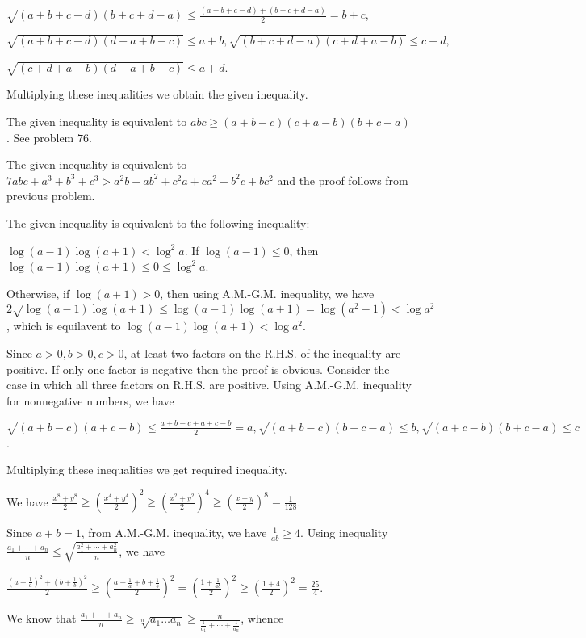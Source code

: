   $\sqrt{(a + b + c - d)(b + c + d - a)}\leq\frac{(a + b + c - d) + (b + c + d - a)}{2} = b + c$,

  $\sqrt{(a + b + c - d)(d + a + b - c)}\leq a + b, \sqrt{(b + c + d - a)(c + d + a - b)}\leq c + d,$

  $\sqrt{(c + d + a - b)(d + a + b - c)}\leq a + d$.

  Multiplying these inequalities we obtain the given inequality.
\item The given inequality is equivalent to $abc \geq (a + b - c)(c + a - b)(b + c - a)$. See problem $76$.
\item The given inequality is equivalent to $7abc + a^3 + b^3 + c^3 > a^2b + ab^2 + c^2a + ca^2 + b^2c +
  bc^2$ and the proof follows from previous problem.
\item The given inequality is equivalent to the following inequality:

  $\log(a - 1)\log(a + 1) < \log^2a$. If $\log(a - 1)\leq 0$, then $\log(a - 1)\log(a + 1)\leq 0\leq
  \log^2a$.

  Otherwise, if $\log(a + 1) > 0$, then using A.M.-G.M. inequality, we have $2\sqrt{\log(a - 1)\log(a +
    1)}\leq \log(a - 1)\log(a + 1) = \log(a^2 - 1) < \log a^2$, which is equilavent to $\log(a - 1)\log(a +
  1) < \log a^2$.
\item Since $a > 0, b > 0, c > 0$, at least two factors on the R.H.S. of the inequality are positive. If
  only one factor is negative then the proof is obvious. Consider the case in which all three factors on
  R.H.S. are positive. Using A.M.-G.M. inequality for nonnegative numbers, we have

  $\sqrt{(a + b - c)(a + c - b)}\leq \frac{a + b - c + a + c - b}{2} = a, \sqrt{(a + b - c)(b + c - a)}\leq
  b, \sqrt{(a + c - b)(b + c - a)}\leq c$.

  Multiplying these inequalities we get required inequality.
\item We have $\frac{x^8 + y^8}{2}\geq \left(\frac{x^4 + y^4}{2}\right)^2\geq \left(\frac{x^2 +
  y^2}{2}\right)^4\geq \left(\frac{x + y}{2}\right)^8 = \frac{1}{128}$.
\item Since $a + b = 1$, from A.M.-G.M. inequality, we have $\frac{1}{ab}\geq 4$. Using inequality
  $\frac{a_1 + \cdots + a_n}{n}\leq \sqrt{\frac{a_1^2 + \cdots + a_n^2}{n}}$, we have

  $\frac{\left(a + \frac{1}{a}\right)^2 + \left(b + \frac{1}{b}\right)^2}{2}\geq \left(\frac{a + \frac{1}{a}
  + b + \frac{1}{b}}{2}\right)^2 = \left(\frac{1 + \frac{1}{ab}}{2}\right)^2\geq \left(\frac{1 +
  4}{2}\right)^2 = \frac{25}{4}$.
\item We know that $\frac{a_1 + \cdots + a_n}{n}\geq \sqrt[n]{a_1\ldots a_n}\geq \frac{n}{\frac{1}{a_1} +
  \cdots + \frac{1}{a_n}}$, whence

